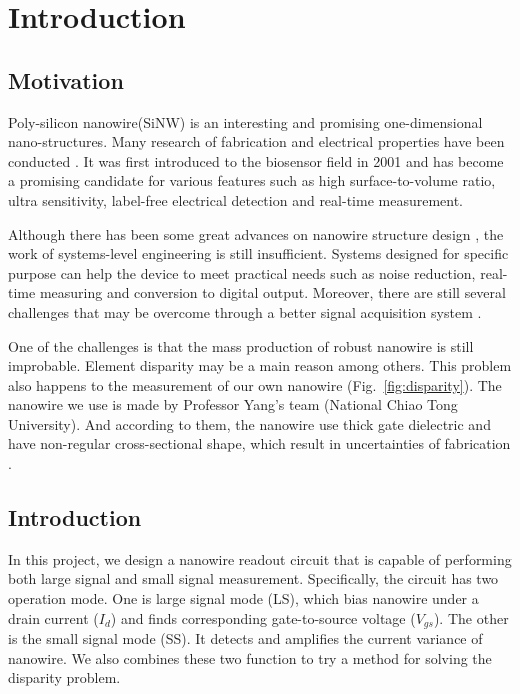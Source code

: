 \chapter{Introduction}
\section{Motivation}
Poly-silicon nanowire(SiNW) is an interesting and promising one-dimensional nano-structures.
Many research of fabrication and electrical properties have been conducted \cite{C25th}.
It was first introduced to the biosensor field in 2001\cite{C2001} and has become a promising candidate for various features such as high surface-to-volume ratio, ultra sensitivity, label-free electrical detection and  real-time measurement.

Although there has been some great advances on nanowire structure design \cite{R1}, the work of systems-level engineering is still insufficient.
Systems designed for specific purpose can help the device to meet practical needs such as noise reduction, real-time measuring and conversion to digital output.
Moreover, there are still several challenges that may be overcome through a better signal acquisition system \cite{R1}.

One of the challenges is that the mass production of robust nanowire is still improbable.
Element disparity may be a main reason among others.
This problem also happens to the measurement of our own nanowire (Fig.~\ref{fig:disparity}).
The nanowire we use is made by Professor Yang's team (National Chiao Tong University).
And according to them, the nanowire use thick gate dielectric and have non-regular cross-sectional shape, which result in uncertainties of fabrication \cite{C6}.


\section{Introduction}
In this project, we design a nanowire readout circuit that is capable of performing both large signal and small signal measurement.
Specifically, the circuit has two operation mode.
One is large signal mode (LS), which bias nanowire under a drain current ($I_d$) and finds corresponding gate-to-source voltage ($V_{gs}$).
The other is the small signal mode (SS).
It detects and amplifies the current variance of nanowire.
We also combines these two function to try a method for solving the disparity problem.

